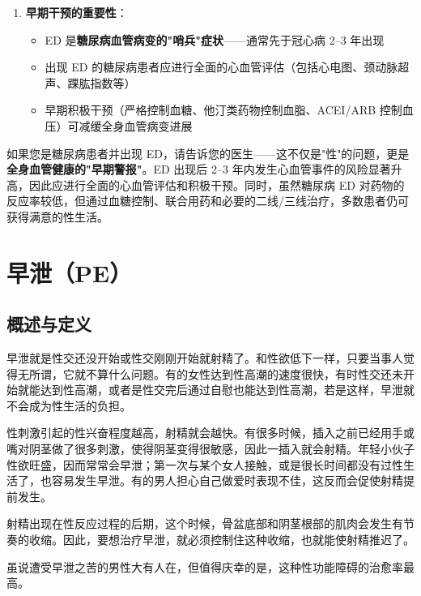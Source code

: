\begin{enumerate}
	\item \textbf{早期干预的重要性}：
	\begin{itemize}
		\item ED 是\textbf{糖尿病血管病变的"哨兵"症状}——通常先于冠心病 2--3 年出现
		\item 出现 ED 的糖尿病患者应进行全面的心血管评估（包括心电图、颈动脉超声、踝肱指数等）
		\item 早期积极干预（严格控制血糖、他汀类药物控制血脂、ACEI/ARB 控制血压）可减缓全身血管病变进展
	\end{itemize}
\end{enumerate}

\begin{tcolorbox}[colback=pink!5!white,colframe=red!50!black,title=贴心小叮咛]
如果您是糖尿病患者并出现 ED，请告诉您的医生——这不仅是"性"的问题，更是\textbf{全身血管健康的"早期警报"}。ED 出现后 2--3 年内发生心血管事件的风险显著升高，因此应进行全面的心血管评估和积极干预。同时，虽然糖尿病 ED 对药物的反应率较低，但通过血糖控制、联合用药和必要的二线/三线治疗，多数患者仍可获得满意的性生活。
\end{tcolorbox}

\section{早泄（PE）}
\subsection{概述与定义}

早泄就是性交还没开始或性交刚刚开始就射精了。和性欲低下一样，只要当事人觉得无所谓，它就不算什么问题。有的女性达到性高潮的速度很快，有时性交还未开始就能达到性高潮，或者是性交完后通过自慰也能达到性高潮，若是这样，早泄就不会成为性生活的负担。

性刺激引起的性兴奋程度越高，射精就会越快。有很多时候，插入之前已经用手或嘴对阴茎做了很多刺激，使得阴茎变得很敏感，因此一插入就会射精。年轻小伙子性欲旺盛，因而常常会早泄；第一次与某个女人接触，或是很长时间都没有过性生活了，也容易发生早泄。有的男人担心自己做爱时表现不佳，这反而会促使射精提前发生。

射精出现在性反应过程的后期，这个时候，骨盆底部和阴茎根部的肌肉会发生有节奏的收缩。因此，要想治疗早泄，就必须控制住这种收缩，也就能使射精推迟了。

虽说遭受早泄之苦的男性大有人在，但值得庆幸的是，这种性功能障碍的治愈率最高。

